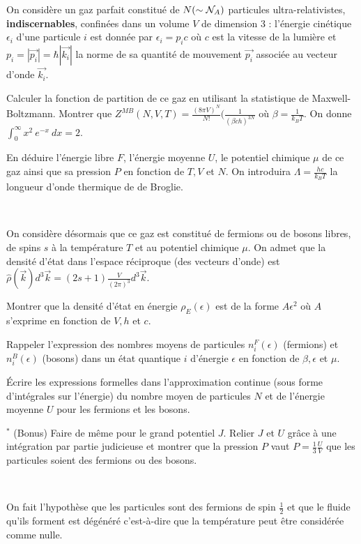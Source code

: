 
On considère un gaz parfait constitué de $N (\sim {\cal N}_A)$ particules ultra-relativistes, {\bf indiscernables}, confinées dans un volume $V$ de dimension 3 : l'énergie cinétique $\epsilon_i$ d'une particule $i$ est donnée par $\epsilon_i= p_ic$ où $c$ est la vitesse de la lumière et $p_i=|\Vec{p_i}|=\hbar |\Vec{k_i}|$ la norme de sa quantité de mouvement $\Vec{p_i}$ associée au vecteur d'onde $\Vec{k_i}$.  

\medskip

\question Calculer la fonction de partition de ce gaz en utilisant la statistique de Maxwell-Boltzmann. Montrer que $Z^{MB}(N,V,T)=\frac{(8 \pi V)^N}{N!} (\frac{1}{(\beta c h)^{3N}}$ où $\beta=\frac{1}{k_BT}$. On donne $\int_0^{\infty} x^2 \ e^{-x} \ dx =2.$

\question En déduire l'énergie libre $F$, l'énergie moyenne $U$, le potentiel chimique $\mu$ de ce gaz ainsi que sa pression $P$ en fonction de $T, V$ et $N$. On introduira $\Lambda=\frac{hc}{k_BT}$ la longueur d'onde thermique de de Broglie.

\ 

On considère désormais que ce gaz est constitué de fermions ou de bosons libres, de spins $s$ à la température $T$ et au potentiel chimique $\mu$. On admet que la densité d'état dans l'espace réciproque (des vecteurs d'onde) est $\hat{\rho}(\Vec{k})d^3 \Vec{k}=(2s+1) \frac{V}{(2 \pi)^3} d^3 \Vec{k}$.

\question Montrer que la densité d'état en énergie $\rho_E(\epsilon)$ est de la forme $A \epsilon^2$ où $A$ s'exprime en fonction de $V, h$ et $c$. 

\question Rappeler l'expression des nombres moyens de particules $n_i^F(\epsilon)$ (fermions) et $n_i^B(\epsilon)$ (bosons) dans un état quantique $i$ d'énergie $\epsilon$ en fonction de $\beta, \epsilon$ et $\mu$.

\question \'Ecrire les expressions formelles dans l'approximation continue (sous forme d'intégrales sur l'énergie)  du nombre moyen de particules $N$ et de l'énergie moyenne $U$ pour les fermions et les bosons.

\question$^*$ (Bonus) Faire de même pour le grand potentiel $J$. Relier $J$ et $U$ grâce à une intégration par partie judicieuse et montrer que la pression $P$ vaut $P=\frac{1}{3}\frac{U}{V}$ que les particules soient des fermions ou des bosons. 

\ 

On fait l'hypothèse que les particules sont des fermions de spin $\frac{1}{2}$ et que le fluide qu'ils forment est dégénéré c'est-à-dire que la température peut être considérée comme nulle.

